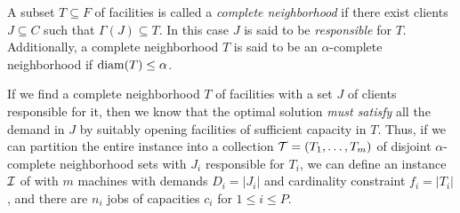 \begin{definition} \label{def:comp-nbr}
	A subset $T\subseteq F$ of facilities is called a {\em complete neighborhood} if there exist clients $J\subseteq C$ such that $\Gamma(J) \subseteq T$.
	In this case $J$ is said to be {\em responsible} for $T$. Additionally, a complete neighborhood $T$ is said to be an $\alpha$-complete neighborhood if $\mathrm{diam}(T) \leq \alpha$.
\end{definition}

If we find a complete neighborhood $T$ of facilities with a set $J$ of clients responsible for it, then we know that the optimal solution \emph{must satisfy} all the demand in $J$ by suitably opening facilities of sufficient capacity in $T$.
Thus, if we can partition the entire instance into a collection ${\cal T} = (T_1,\ldots,T_m)$ of disjoint $\alpha$-complete neighborhood sets with $J_i$ responsible for $T_i$, we can define an instance ${\cal I}$ of \cckp with $m$ machines with demands $D_i = |J_i|$ and cardinality constraint $f_i = |T_i|$, and there are $n_i$ jobs of capacities $c_i$ for $1 \leq i \leq P$.

